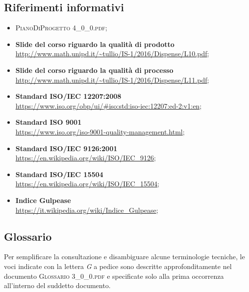 \subsection{Riferimenti informativi}
\begin{itemize}
	\item \textsc{PianoDiProgetto 4\_0\_0.pdf};
	\item \textbf{Slide del corso riguardo la qualità di prodotto}\\ \url{http://www.math.unipd.it/~tullio/IS-1/2016/Dispense/L10.pdf};
	\item \textbf{Slide del corso riguardo la qualità di processo}\\ \url{http://www.math.unipd.it/~tullio/IS-1/2016/Dispense/L11.pdf};
	\item \textbf{Standard ISO/IEC 12207:2008}\\ \url{https://www.iso.org/obp/ui/#iso:std:iso-iec:12207:ed-2:v1:en};
	\item \textbf{Standard ISO 9001}\\ \url{https://www.iso.org/iso-9001-quality-management.html};
	\item \textbf{Standard ISO/IEC 9126:2001}\\ \url{https://en.wikipedia.org/wiki/ISO/IEC_9126};
	\item \textbf{Standard ISO/IEC 15504}\\ \url{https://en.wikipedia.org/wiki/ISO/IEC_15504};
	\item \textbf{Indice Gulpease}\\ \url{https://it.wikipedia.org/wiki/Indice_Gulpease};	
\end{itemize}

\subsection{Glossario}
Per semplificare la consultazione e disambiguare alcune terminologie tecniche, le voci indicate con la lettera \textit{G} a pedice sono descritte approfonditamente nel documento \textsc{Glossario 3\_0\_0.pdf} e specificate solo alla prima occorrenza all'interno del suddetto documento.